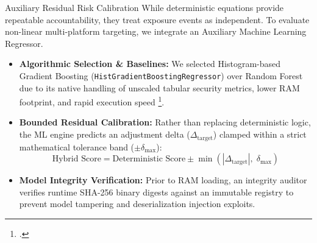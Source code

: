 \documentclass[aspectratio=169,10pt]{beamer}
\begin{document}
\begin{frame}{Auxiliary Residual Risk Calibration}
  \small
  While deterministic equations provide repeatable accountability, they treat exposure events as independent. To evaluate non-linear multi-platform targeting, we integrate an Auxiliary Machine Learning Regressor.
  
  \vspace{0.20cm}
  \begin{itemize}\setlength{\itemsep}{0.22cm}
    \item \textbf{Algorithmic Selection \& Baselines:} We selected Histogram-based Gradient Boosting (\texttt{HistGradientBoostingRegressor}) over Random Forest due to its native handling of unscaled tabular security metrics, lower RAM footprint, and rapid execution speed \footcite{pedregosa2011, ke2017}.
    \item \textbf{Bounded Residual Calibration:} Rather than replacing deterministic logic, the ML engine predicts an adjustment delta ($\Delta_{\text{target}}$) clamped within a strict mathematical tolerance band ($\pm \delta_{\text{max}}$):
      $$\text{Hybrid Score} = \text{Deterministic Score} \pm \min(|\Delta_{\text{target}}|, \; \delta_{\text{max}})$$
    \item \textbf{Model Integrity Verification:} Prior to RAM loading, an integrity auditor verifies runtime SHA-256 binary digests against an immutable registry to prevent model tampering and deserialization injection exploits.
  \end{itemize}
\end{frame}
\end{document}
